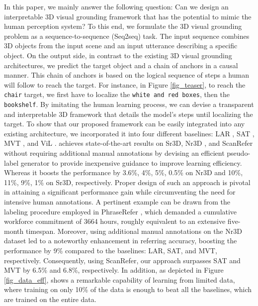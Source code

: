 In this paper, we mainly answer the following question: Can we design an interpretable 3D visual grounding framework that has the potential to mimic the human perception system?
To this end, we formulate the 3D visual grounding problem as a sequence-to-sequence (Seq2seq) task.
The input sequence combines 3D objects from the input scene and an input utterance describing a specific object.
On the output side, in contrast to the existing 3D visual grounding architectures, we predict the target object and a chain of anchors in a causal manner.
This chain of anchors is based on the logical sequence of steps a human will follow to reach the target.
For instance, in Figure \ref{fig_teaser}, to reach the \texttt{chair} target, we first have to localize the \texttt{white and red boxes}, then the \texttt{bookshelf}.
By imitating the human learning process, we can devise a transparent and interpretable 3D framework that details the model's steps until localizing the target.
To show that our proposed framework can be easily integrated into any existing architecture, we incorporated it into four different baselines: LAR \citep{bakr2022look}, SAT \citep{yang2021sat}, MVT \citep{huang2022multi}, and ViL \citep{chen2022language}.
{\papernameAbbrev} achieves state-of-the-art results on Sr3D, Nr3D \citep{achlioptas2020referit3d}, and ScanRefer \citep{chen2020scanrefer} without requiring additional manual annotations by devising an efficient pseudo-label generator to provide inexpensive guidance to improve learning efficiency.
Whereas it boosts the performance by 3.6\%, 4\%, 5\%, 0.5\% on Nr3D and 10\%, 11\%, 9\%, 1\% on Sr3D, respectively.
Proper design of such an approach is pivotal in attaining a significant performance gain while circumventing the need for intensive human annotations. A pertinent example can be drawn from the labeling procedure employed in PhraseRefer \citep{yuan2022toward}, which demanded a cumulative workforce commitment of 3664 hours, roughly equivalent to an extensive five-month timespan.
Moreover, using additional manual annotations on the Nr3D dataset led to a noteworthy enhancement in referring accuracy, boosting the performance by 9\% compared to the baselines: LAR, SAT, and MVT, respectively. 
Consequently, using ScanRefer, our approach surpasses SAT and MVT by 6.5\% and 6.8\%, respectively.
In addition, as depicted in Figure \ref{fig_data_eff}, {\papernameAbbrev} shows a remarkable capability of learning from limited data, where training on only 10\% of the data is enough to beat all the baselines, which are trained on the entire data.
